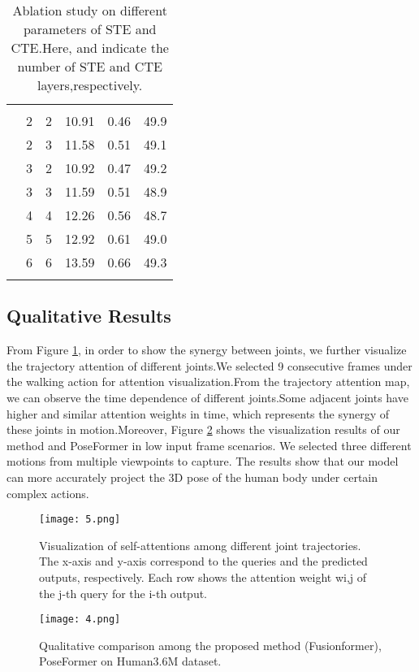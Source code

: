 \documentclass{article}
\begin{document}
\begin{table}[h]
\begin{center}
\caption{\label{lab5}Ablation study on different parameters of STE and CTE.Here,  and  indicate the number of STE and CTE layers,respectively.\\}
\begin{tabular}{cccccc}
\toprule[2pt]
\noalign{\smallskip}
& & & & &\\
\noalign{\smallskip}
\hline
\noalign{\smallskip} 
&2 &2 &10.91&0.46 &49.9\\
\noalign{\smallskip}
&2 &3 &11.58&0.51 &49.1\\
\noalign{\smallskip}
&3 &2 &10.92&0.47 &49.2\\
\noalign{\smallskip}
&3 &3 &11.59&0.51 &48.9\\
\noalign{\smallskip}
&4 &4 &12.26&0.56&48.7\\
\noalign{\smallskip}
&5 &5 &12.92&0.61&49.0\\
\noalign{\smallskip}
&6 &6 &13.59&0.66&49.3\\
\noalign{\smallskip}
\toprule[2pt]
\end{tabular}
\end{center}
\end{table}

\subsection{Qualitative Results}
From Figure \ref{fig5}, in order to show the synergy between joints, we further visualize the trajectory attention of different joints.We selected 9 consecutive frames under the walking action for attention visualization.From the trajectory attention map, we can observe the time dependence of different joints.Some adjacent joints have higher and similar attention weights in time, which represents the synergy of these joints in motion.Moreover, Figure \ref{fig6} shows the visualization results of our method and PoseFormer in low input frame scenarios. We selected three different motions from multiple viewpoints to capture. The results show that our model can more accurately project the 3D pose of the human body under certain complex actions.

\begin{figure}[h]
\centering
\texttt{[image: 5.png]}
\caption{Visualization of self-attentions among different joint trajectories. The x-axis and y-axis correspond to the queries and the predicted outputs, respectively. Each row shows the attention weight wi,j of the j-th query for the i-th output.}
\label{fig5}
\end{figure}
\begin{figure}[h]
\centering
\texttt{[image: 4.png]}
\caption{Qualitative comparison among the proposed method (Fusionformer),
PoseFormer on Human3.6M dataset.}
\label{fig6}
\end{figure}
\end{document}
